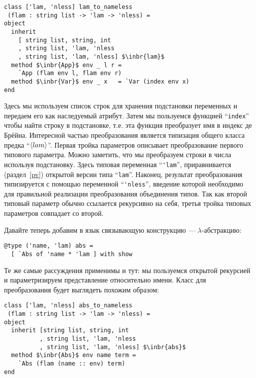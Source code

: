 \begin{lstlisting}
class ['lam, 'nless] lam_to_nameless
 (flam : string list -> 'lam -> 'nless) =
object
  inherit 
    [ string list, string, int
    , string list, 'lam, 'nless
    , string list, 'lam, 'nless] $\inbr{lam}$
  method $\inbr{App}$ env _ l r = 
    `App (flam env l, flam env r)
  method $\inbr{Var}$ env _ x   = `Var (index env x)
end
\end{lstlisting}


\noindent Здесь мы используем список строк для хранения подстановки переменных и  передаем его как наследуемый атрибут. Затем мы пользуемся функцией 
``\lstinline{index}'' чтобы найти строку в подстановке, т.е.  эта функция преобразует имя в индекс де Брёйна. 
Интересной частью преобразования является типизация общего класса предка ``$\left<lam\right>$''. 
Первая тройка параметров описывает преобразование первого типового параметра. Можно заметить, что мы преобразуем строки в числа используя подстановку.
Здесь типовая переменная ``\lstinline{'lam}'', 
приравнивается (раздел~\ref{pv}) открытой версии типа ``\lstinline{lam}''. %
Наконец, результат преобразования типизируется с помощью переменной ``\lstinline{'nless}'', введение которой необходимо для правильной реализации преобразования объединения типов.
Так как второй типовый параметр обычно ссылается рекурсивно на себя, третья тройка типовых параметров совпадает со второй.

Давайте теперь добавим в язык связывающую конструкцию --- $\lambda$-абстракцию:

\begin{lstlisting}
@type ('name, 'lam) abs = 
  [ `Abs of 'name * 'lam ] with show
\end{lstlisting}

Те же самые рассуждения применимы и тут: мы пользуемся открытой рекурсией и параметризируем представление относительно имени.
Класс для преобразования будет выглядеть похожим образом:

\begin{lstlisting}
class ['lam, 'nless] abs_to_nameless
 (flam : string list -> 'lam -> 'nless) =
object
  inherit [string list, string, int
          , string list, 'lam, 'nless
          , string list, 'lam, 'nless] $\inbr{abs}$
  method $\inbr{Abs}$ env name term = 
    `Abs (flam (name :: env) term)
end
\end{lstlisting}

